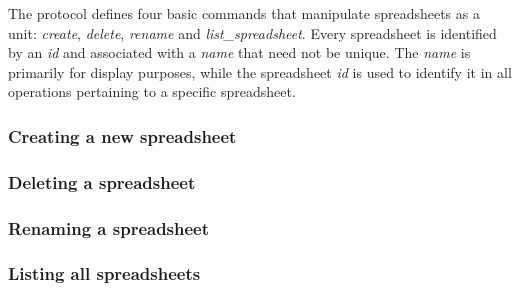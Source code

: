 The protocol defines four basic commands that manipulate spreadsheets as 
a unit: \emph{create}, \emph{delete}, \emph{rename} and \emph{list\_spreadsheet}. 
Every spreadsheet is identified by an \emph{id} and associated with a \emph{name} that 
need not be unique. The \emph{name} is primarily for display purposes, while the 
spreadsheet \emph{id} is used to identify it in all operations pertaining to a 
specific spreadsheet.

\subsubsection{Creating a new spreadsheet}


\subsubsection{Deleting a spreadsheet}


\subsubsection{Renaming a spreadsheet}


\subsubsection{Listing all spreadsheets}

